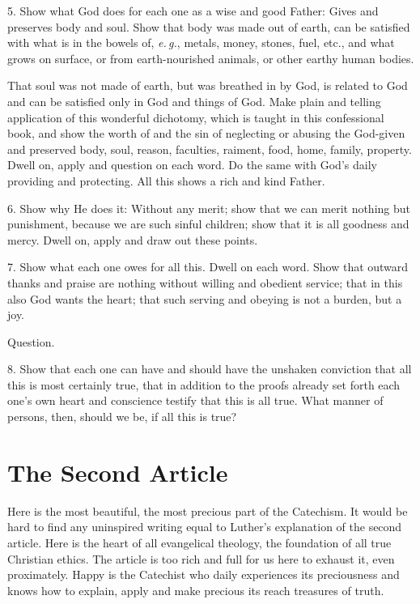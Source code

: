  5. Show what God does for each one as a wise and good Father: Gives and preserves body and soul. Show that body was made out of earth, can be satisfied with what is in the bowels of, \emph{e.\,g.}, metals, money, stones, fuel, etc., and what grows on surface, or from earth-nourished animals, or other earthy human bodies.

That soul was not made of earth, but was breathed in by God, is related to God and can be satisfied only in God and things of God. Make plain and telling application of this wonderful dichotomy, which is taught in this confessional book, and show the worth of and the sin of neglecting or abusing the God-given and preserved body, soul, reason, faculties, raiment, food, home, family, property. Dwell on, apply and question on each
word. Do the same with God’s daily providing and protecting. All this shows a rich and kind Father.

 6. Show why He does it: Without any merit; show that we can merit nothing but punishment, because we are such sinful children; show that it is all goodness and mercy. Dwell on, apply and draw out these points.

 7. Show what each one owes for all this. Dwell on each word. Show that outward thanks and praise are nothing without willing and obedient service; that in this also God wants the heart; that such serving and obeying is not a burden, but a joy.

Question.

8. Show that each one can have and should have the unshaken conviction that all this is most certainly true, that in addition to the proofs already set forth each one’s own heart and conscience testify that this is all true. What manner of persons, then, should we be, if all this is true?

\section{The Second Article}

Here is the most beautiful, the most precious part of the Catechism. It would be hard to find any uninspired writing equal to Luther’s explanation of the second article. Here is the heart of all evangelical theology, the foundation of all true Christian ethics. The article is too rich and full for us here to exhaust it, even proximately. Happy is the Catechist
who daily experiences its preciousness and knows how to explain, apply and make precious its reach treasures of truth.

